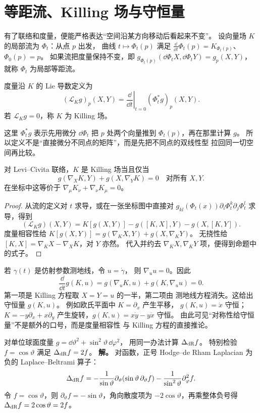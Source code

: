 \section{等距流、Killing 场与守恒量}

有了联络和度量，便能严格表达“空间沿某方向移动后看起来不变”。
设向量场 \(K\) 的局部流为 \(\Phi_t\)：从点 \(p\) 出发，
曲线 \(t\mapsto\Phi_t(p)\) 满足
\(\frac{\dd}{\dd t}\Phi_t(p)=K_{\Phi_t(p)}\)、\(\Phi_0(p)=p\)。
如果流把度量保持不变，即
\(g_{\Phi_t(p)}(\dd\Phi_t X,\dd\Phi_t Y)=g_p(X,Y)\)，
就称 \(\Phi_t\) 为局部等距流。

\begin{definition}
度量沿 \(K\) 的 Lie 导数定义为
\[
(\mathcal L_Kg)_p(X,Y)
=\left.\frac{\dd}{\dd t}\right|_{t=0}
(\Phi_t^*g)_p(X,Y).
\]
若 \(\mathcal L_Kg=0\)，称 \(K\) 为 Killing 场。
\end{definition}

这里 \(\Phi_t^*g\) 表示先用微分 \(\dd\Phi_t\)
把 \(p\) 处两个向量推到 \(\Phi_t(p)\)，再在那里计算 \(g\)。
所以定义不是“直接微分不同点的矩阵”，而是先把不同点的双线性型
拉回同一切空间再比较。

\begin{proposition}[Killing 方程]
对 Levi--Civita 联络，\(K\) 是 Killing 场当且仅当
\[
g(\nabla_XK,Y)+g(X,\nabla_YK)=0
\quad\text{对所有 }X,Y.
\]
在坐标中这等价于
\(\nabla_\mu K_\nu+\nabla_\nu K_\mu=0\)。
\end{proposition}
\begin{proof}
从流的定义对 \(t\) 求导，或在一张坐标图中直接对
\(g_{kl}(\Phi_t(x))\partial_i\Phi_t^k\partial_j\Phi_t^l\)
求导，得到
\[
(\mathcal L_Kg)(X,Y)
=K[g(X,Y)]-g([K,X],Y)-g(X,[K,Y]).
\]
度量相容性给
\(K[g(X,Y)]=g(\nabla_KX,Y)+g(X,\nabla_KY)\)。
无挠性给 \([K,X]=\nabla_KX-\nabla_XK\)，对 \(Y\) 亦然。
代入并约去 \(\nabla_KX,\nabla_KY\) 项，便得到命题中的式子。
\end{proof}

若 \(\gamma(t)\) 是仿射参数测地线，令 \(u=\dot\gamma\)，
则 \(\nabla_uu=0\)。因此
\[
\frac{\dd}{\dd t}g(K,u)
=g(\nabla_uK,u)+g(K,\nabla_uu)=0.
\]
第一项是 Killing 方程取 \(X=Y=u\) 的一半，第二项由
测地线方程消失。这给出守恒量 \(g(K,u)\)。
例如欧氏平面中 \(K=\partial_x\) 产生平移，
\(g(K,u)=\dot x\) 守恒；\(K=-y\partial_x+x\partial_y\)
产生旋转，\(g(K,u)=x\dot y-y\dot x\) 守恒。
由此可见“对称性给守恒量”不是额外的口号，而是度量相容性
与 Killing 方程的直接推论。


\par
\begin{workedexample}
对单位球面度量
\(g=\dd\vartheta^2+\sin^2\vartheta\,\dd\varphi^2\)，
用同一办法计算 \(\Delta_{\rm dR}f\)。
特别检验 \(f=\cos\vartheta\) 满足
\(\Delta_{\rm dR}f=2f\)。
\textbf{解。} 对函数，正号 Hodge--de Rham Laplacian 为负的 Laplace--Beltrami 算子：
\[
\Delta_{\rm dR}f=-\frac1{\sin\vartheta}\partial_\vartheta
(\sin\vartheta\,\partial_\vartheta f)
-\frac1{\sin^2\vartheta}\partial_\varphi^2f.
\]
令 \(f=\cos\vartheta\)，则 \(\partial_\vartheta f=-\sin\vartheta\)，角向散度项为 \(-2\cos\vartheta\)，再乘整体负号得 \(\Delta_{\rm dR}f=2\cos\vartheta=2f\)。
\end{workedexample}
\par
